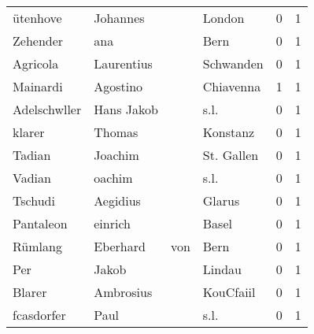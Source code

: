 \begin{center}
\begin{tiny}
\begin{longtabu}{llllrr}
                 ütenhove &                           Johannes &             &                                      London &          0 &         1 \\
                 Zehender &                                ana &             &                                        Bern &          0 &         1 \\
                 Agricola &                         Laurentius &             &                                   Schwanden &          0 &         1 \\
                 Mainardi &                           Agostino &             &                                   Chiavenna &          1 &         1 \\
             Adelschwller &                         Hans Jakob &             &                                        s.l. &          0 &         1 \\
                   klarer &                             Thomas &             &                                    Konstanz &          0 &         1 \\
                   Tadian &                            Joachim &             &                                  St. Gallen &          0 &         1 \\
                   Vadian &                             oachim &             &                                        s.l. &          0 &         1 \\
                  Tschudi &                           Aegidius &             &                                      Glarus &          0 &         1 \\
                Pantaleon &                            einrich &             &                                       Basel &          0 &         1 \\
                  Rümlang &                           Eberhard &         von &                                        Bern &          0 &         1 \\
                      Per &                              Jakob &             &                                      Lindau &          0 &         1 \\
                   Blarer &                          Ambrosius &             &                                   KouCfaiil &          0 &         1 \\
               fcasdorfer &                               Paul &             &                                        s.l. &          0 &         1 \\

\end{longtabu}
\end{tiny}
\end{center}
